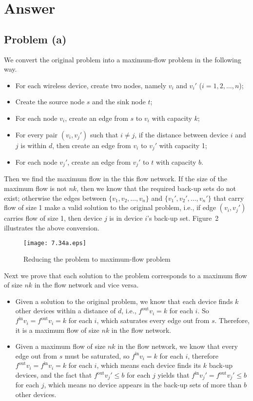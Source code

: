 \documentclass[12pt,letterpaper]{article}
\begin{document}
\section*{Answer}

\subsection*{Problem (a)}
We convert the original problem into a maximum-flow problem in the following way.
\begin{itemize}
\item For each wireless device, create two nodes, namely $v_i$ and $v_i'$ ($i=1, 2, \dots, n$);
\item Create the source node $s$ and the sink node $t$;
\item For each node $v_i$, create an edge from $s$ to $v_i$ with capacity $k$;
\item For every pair $(v_i, v_j')$ such that $i \ne j$, if the distance between device $i$ and $j$ is within $d$, then create an edge from $v_i$ to $v_j'$ with capacity 1;
\item For each node $v_j'$, create an edge from $v_j'$ to $t$ with capacity $b$.
\end{itemize}

Then we find the maximum flow in the this flow network. If the size of the maximum flow is not $nk$, then we know that the required back-up sets do not exist; otherwise the edges between $\{v_1, v_2, \dots, v_n\}$ and $\{v_1', v_2', \dots, v_n'\}$ that carry flow of size 1 make a valid solution to the original problem, i.e., if edge $(v_i, v_j')$ carries flow of size 1, then device $j$ is in device $i$'s back-up set. Figure~2 illustrates the above conversion.

\begin{figure}
\begin{center}
\texttt{[image: 7.34a.eps]}
\caption{Reducing the problem to maximum-flow problem}
\end{center}
\end{figure}

Next we prove that each solution to the problem corresponds to a maximum flow of size $nk$ in the flow network and vice versa.
\begin{itemize}
\item Given a solution to the original problem, we know that each device finds $k$ other devices within a distance of $d$, i.e., $f^{\textrm{out}}v_i = k$ for each $i$. So $f^{\textrm{in}}v_i = f^{\textrm{out}}v_i = k$ for each $i$, which saturates every edge out from $s$. Therefore, it is a maximum flow of size $nk$ in the flow network.
\item Given a maximum flow of size $nk$ in the flow network, we know that every edge out from $s$ must be saturated, so $f^{\textrm{in}}v_i=k$ for each $i$, therefore $f^{\textrm{out}}v_i=f^{\textrm{in}}v_i=k$ for each $i$, which means each device finds its $k$ back-up devices, and the fact that $f^{\textrm{out}}v_j'\le b$ for each $j$ yields that $f^{\textrm{in}}v_j'=f^{\textrm{out}}v_j'\le b$ for each $j$, which means no device appears in the back-up sets of more than $b$ other devices. 
\end{itemize}
\end{document}
